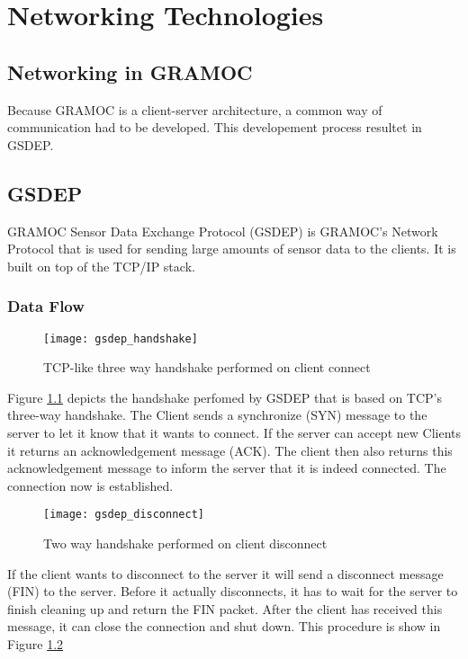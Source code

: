 \chapter{Networking Technologies}
\label{ch:networkingtechnologies}

\section{Networking in GRAMOC}

Because GRAMOC is a client-server architecture, a common way of communication had to be developed. This developement process resultet in GSDEP.

\section{GSDEP}

GRAMOC Sensor Data Exchange Protocol (GSDEP) is GRAMOC's Network Protocol that is used for sending large amounts of sensor data to the clients. It is built on top of the TCP/IP stack.

\subsection{Data Flow}

\begin{figure}[H]
	\centering
	\texttt{[image: gsdep\_handshake]}
	\caption{TCP-like three way handshake performed on client connect}
	\label{fig:handshake}
\end{figure}

Figure \ref{fig:handshake} depicts the handshake perfomed by GSDEP that is based on TCP's three-way handshake. The Client sends a synchronize (SYN) message to the server to let it know that it wants to connect. If the server can accept new Clients it returns an acknowledgement message (ACK). The client then also returns this acknowledgement message to inform the server that it is indeed connected. The connection now is established.

\begin{figure}[H]
	\centering
	\texttt{[image: gsdep\_disconnect]}
	\caption{Two way handshake performed on client disconnect}
	\label{fig:disconnect}
\end{figure}

If the client wants to disconnect to the server it will send a disconnect message (FIN) to the server. Before it actually disconnects, it has to wait for the server to finish cleaning up and return the FIN packet. After the client has received this message, it can close the connection and shut down. This procedure is show in Figure \ref{fig:disconnect}

